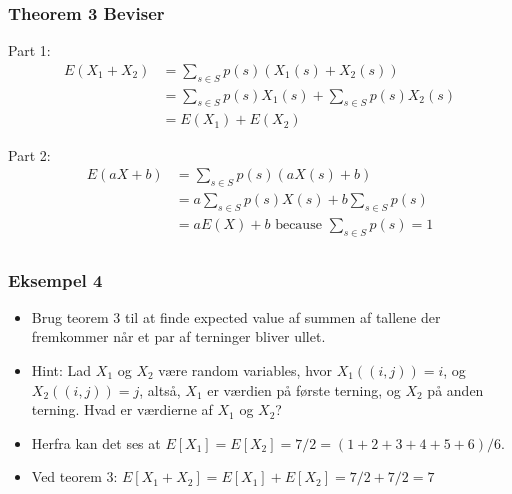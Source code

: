 \documentclass{beamer}
\begin{document}
\begin{frame}
  \frametitle{Theorem 3 Beviser}
  Part 1:
  \begin{equation}
    \begin{split}
      E(X_{1} + X_{2}) &= \sum_{s \in S}p(s) (X_{1}(s) + X_2(s)) \\
                       &= \sum_{s \in S}p(s) X_{1}(s) + \sum_{s \in S}p(s) X_{2}(s)\\
                       &= E(X_{1}) + E(X_{2})
    \end{split}
  \end{equation}

  Part 2:
  \begin{equation}
    \begin{split}
      E(aX+b) &= \sum_{s \in S}p(s)(aX(s)+b)\\
              &= a \sum_{s \in S}p(s)X(s) + b \sum_{s \in S}p(s)\\
              &= aE(X) + b \text{ because } \sum_{s \in S}p(s) = 1\\
    \end{split}
  \end{equation}
\end{frame}

\begin{frame}
  \frametitle{Eksempel 4}
  \begin{itemize}
  \item<1-> Brug teorem 3 til at finde expected value af summen af tallene der fremkommer når et par af terninger bliver ullet. 
  \item<1-> Hint: Lad $X_{1}$  og $X_{2}$ være random variables, hvor $X_{1}((i,j)) = i$, og $X_{2}((i,j)) = j$, altså, $X_{1}$ er værdien på første terning, og $X_{2}$ på anden terning. Hvad er værdierne af $X_{1}$ og $X_{2}$?
  \item<2-> Herfra kan det ses at $E[X_{1}] = E[X_{2}] = 7/2 = (1+2+3+4+5+6)/6$.
  \item<3-> Ved teorem 3: $E[X_{1}+X_{2}] = E[X_{1}] + E[X_{2}] = 7/2 + 7/2 = 7$
  \end{itemize} 
\end{frame}
\end{document}
